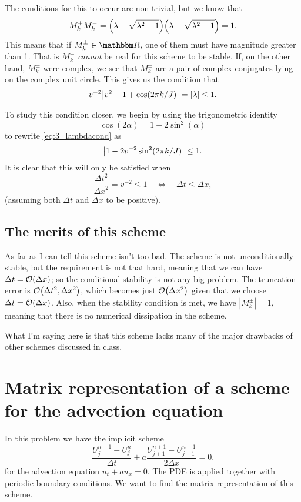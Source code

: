 \documentclass[11pt,letter, swedish, english
]{article}
\newcommand{\Dx}{\ensuremath{\Delta{x}}}
\newcommand{\Dt}{\ensuremath{\Delta{t}}}
\begin{document}
The conditions for this to occur are non-trivial, but we know that 
\begin{equation}
M_k^+M_k^-=\qty(\lambda+\sqrt{\lambda^2-1})
\qty(\lambda-\sqrt{\lambda^2-1})
=1.
\end{equation}
This means that if $M_k^\pm\in\R$, one of them must have magnitude
greater than 1. That is $M_k^\pm$ \emph{cannot} be real for this
scheme to be stable. If, on the other hand, $M_k^\pm$ were complex, we
see that $M_k^\pm$ are a pair of complex conjugates lying on the
complex unit circle. This gives us the condition that
\begin{equation}\label{eq:3_lambdacond}
v^{-2}\abs{v^{2}-1+\cos(2\pi k/J)}=|\lambda|\le1.
\end{equation}

To study this condition closer, we begin by using the trigonometric
identity
\begin{equation}
\cos(2\alpha)=1-2\sin^2(\alpha)
\end{equation}
to rewrite \eqref{eq:3_lambdacond} as
\begin{equation}
\abs{1-2v^{-2}\sin^2(2\pi k/J)}\le1.
\end{equation}
It is clear that this will only be satisfied when
\begin{equation}
\frac{\Dt^2}{\Dx^2}=v^{-2}\le1
\quad\Longleftrightarrow\quad
\Dt\le\Dx,
\end{equation}
(assuming both $\Dt$ and $\Dx$ to be positive).

\subsection{The merits of this scheme}
As far as I can tell this scheme isn't too bad. 
The scheme is not unconditionally stable, but the requirement is not
that hard, meaning that we can have $\Dt=\order{\Dx}$; so the
conditional stability is not any big problem.
The truncation error is $\order{\Dt^2,\Dx^2}$, which becomes just
$\order{\Dx^2}$ given that we choose $\Dt=\order{\Dx}$. 
Also, when the stability condition is met, we have $|M_k^\pm|=1$,
meaning that there is no numerical dissipation in the scheme. 

What I'm saying here is that this scheme lacks many of the major
drawbacks of other schemes discussed in class. 




\section{Matrix representation of a scheme for the advection equation}
\newcommand{\odelta}[1]{{\mathring{\delta}^{J}_{#1}}}
In this problem we have the implicit scheme
\begin{equation}
\frac{U_j^{n+1}-U_j^n}{\Dt}
+a\frac{U_{j+1}^{n+1}-U_{j-1}^{n+1}}{2\Dx}=0.
\end{equation}
for the advection equation $u_t+au_x=0$. The PDE is applied
together with periodic boundary conditions.
We want to find the matrix representation of this scheme.
\end{document}
